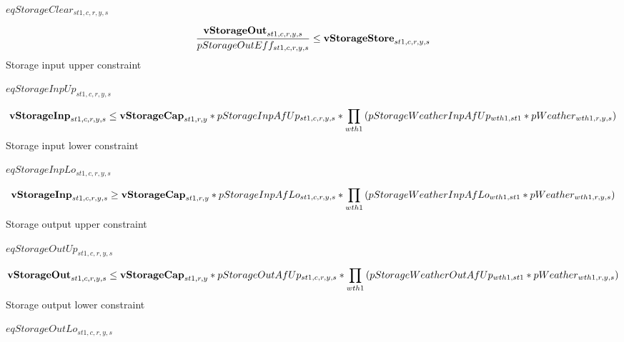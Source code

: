 \documentclass{article}
\begin{document}
$eqStorageClear_{st1,c,r,y,s}$





\begin{dmath}
\frac{{\bf vStorageOut}_{st1,c,r,y,s}}{pStorageOutEff_{st1,c,r,y,s}}  \le  {\bf vStorageStore}_{st1,c,r,y,s}
\end{dmath}
Storage input upper constraint







$eqStorageInpUp_{st1,c,r,y,s}$





\begin{dmath}
{\bf vStorageInp}_{st1,c,r,y,s}  \le  {\bf vStorageCap}_{st1,r,y}*pStorageInpAfUp_{st1,c,r,y,s}*\prod_{wth1}{\left(pStorageWeatherInpAfUp_{wth1,st1}*pWeather_{wth1,r,y,s}\right)}
\end{dmath}
Storage input lower constraint







$eqStorageInpLo_{st1,c,r,y,s}$





\begin{dmath}
{\bf vStorageInp}_{st1,c,r,y,s}  \ge  {\bf vStorageCap}_{st1,r,y}*pStorageInpAfLo_{st1,c,r,y,s}*\prod_{wth1}{\left(pStorageWeatherInpAfLo_{wth1,st1}*pWeather_{wth1,r,y,s}\right)}
\end{dmath}
Storage output upper constraint







$eqStorageOutUp_{st1,c,r,y,s}$





\begin{dmath}
{\bf vStorageOut}_{st1,c,r,y,s}  \le  {\bf vStorageCap}_{st1,r,y}*pStorageOutAfUp_{st1,c,r,y,s}*\prod_{wth1}{\left(pStorageWeatherOutAfUp_{wth1,st1}*pWeather_{wth1,r,y,s}\right)}
\end{dmath}
Storage output lower constraint







$eqStorageOutLo_{st1,c,r,y,s}$
\end{document}
